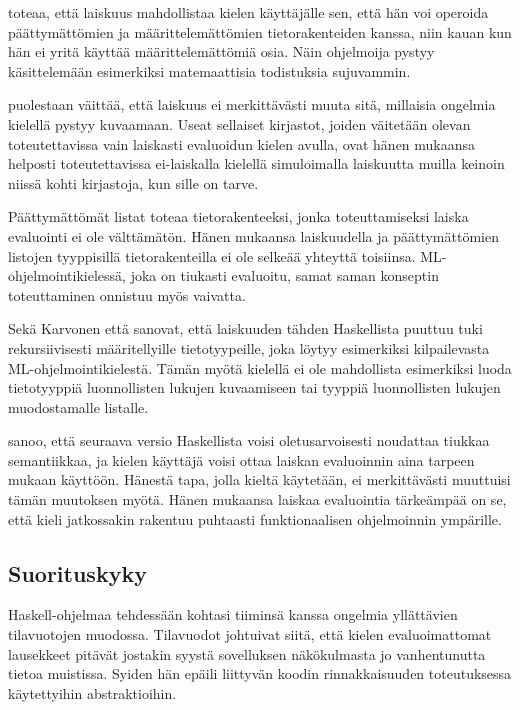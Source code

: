 \citet{haskellwikilaziness} toteaa, että laiskuus mahdollistaa kielen käyttäjälle sen, että hän voi operoida päättymättömien ja määrittelemättömien tietorakenteiden kanssa, niin kauan kun hän ei yritä käyttää määrittelemättömiä osia. Näin ohjelmoija pystyy käsittelemään esimerkiksi matemaattisia todistuksia sujuvammin.

\citet{vesakarvonen} puolestaan väittää, että laiskuus ei merkittävästi muuta sitä, millaisia ongelmia kielellä pystyy kuvaamaan. Useat sellaiset kirjastot, joiden väitetään olevan toteutettavissa vain laiskasti evaluoidun kielen avulla, ovat hänen mukaansa helposti toteutettavissa ei-laiskalla kielellä simuloimalla laiskuutta muilla keinoin niissä kohti kirjastoja, kun sille on tarve.

Päättymättömät listat \citet{pointoflaziness} toteaa tietorakenteeksi, jonka toteuttamiseksi laiska evaluointi ei ole välttämätön. Hänen mukaansa laiskuudella ja päättymättömien listojen tyyppisillä tietorakenteilla ei ole selkeää yhteyttä toisiinsa. ML-ohjelmointikielessä, joka on tiukasti evaluoitu, samat saman konseptin toteuttaminen onnistuu myös vaivatta.

Sekä Karvonen että \citet{pointoflaziness} sanovat, että laiskuuden tähden Haskellista puuttuu tuki rekursiivisesti määritellyille tietotyypeille, joka löytyy esimerkiksi kilpailevasta ML-ohjelmointikielestä. Tämän myötä kielellä ei ole mahdollista esimerkiksi luoda tietotyyppiä luonnollisten lukujen kuvaamiseen tai tyyppiä luonnollisten lukujen muodostamalle listalle.

\citet{jonesretrospectiveonhaskell} sanoo, että seuraava versio Haskellista voisi oletusarvoisesti noudattaa tiukkaa semantiikkaa, ja kielen käyttäjä voisi ottaa laiskan evaluoinnin aina tarpeen mukaan käyttöön. Hänestä tapa, jolla kieltä käytetään, ei merkittävästi muuttuisi tämän muutoksen myötä. Hänen mukaansa laiskaa evaluointia tärkeämpää on se, että kieli jatkossakin rakentuu puhtaasti funktionaalisen ohjelmoinnin ympärille.

\subsection{Suorituskyky}

Haskell-ohjelmaa tehdessään \citet{sampson2009experience} kohtasi tiiminsä kanssa ongelmia yllättävien tilavuotojen muodossa. Tilavuodot johtuivat siitä, että kielen evaluoimattomat lausekkeet pitävät jostakin syystä sovelluksen näkökulmasta jo vanhentunutta tietoa muistissa. Syiden hän epäili liittyvän koodin rinnakkaisuuden toteutuksessa käytettyihin abstraktioihin.

